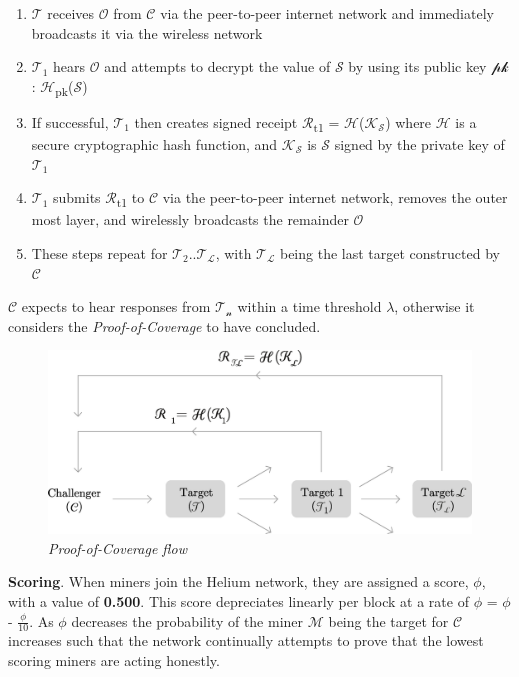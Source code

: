 \documentclass[letterpaper,11pt]{article}
\def\proofofcoverage/{\textit{Proof-of-Coverage}}
\begin{document}
\begin{enumerate}
  \item $\mathcal{T}$ receives $\mathcal{O}$ from $\mathcal{C}$ via the peer-to-peer internet network and immediately broadcasts it via the wireless network
  \item $\mathcal{T_1}$ hears $\mathcal{O}$ and attempts to decrypt the value of $\mathcal{S}$ by using its public key $\mathcal{pk}$: $\mathcal{H}$\textsubscript{pk}($\mathcal{S}$)
  \item If successful, $\mathcal{T_1}$ then creates signed receipt $\mathcal{R}$\textsubscript{t1} = $\mathcal{H}$($\mathcal{K_S}$) where $\mathcal{H}$ is a secure cryptographic hash function, and $\mathcal{K_S}$ is $\mathcal{S}$ signed by the private key of $\mathcal{T_1}$
  \item $\mathcal{T_1}$ submits $\mathcal{R}$\textsubscript{t1} to $\mathcal{C}$ via the peer-to-peer internet network, removes the outer most layer, and wirelessly broadcasts the remainder $\mathcal{O}$
  \item These steps repeat for $\mathcal{T_2}$..$\mathcal{T_L}$, with $\mathcal{T_L}$ being the last target constructed by $\mathcal{C}$
\end{enumerate}

$\mathcal{C}$ expects to hear responses from $\mathcal{T_n}$ within a time threshold $\mathcal{\lambda}$, otherwise it considers the \proofofcoverage/ to have concluded.\newline

\begin{figure}[H]
	\begin{center}
  		\includegraphics[width=\textwidth]{diagram4.eps}
  		\caption{\textit{\proofofcoverage/ flow}}
  		\label{fig:poc-flow}
 	\end{center}
\end{figure}

\textbf{Scoring}. \label{scores} When miners join the Helium network, they are assigned a score, $\mathcal{\phi}$, with a value of \textbf{0.500}. This score depreciates linearly per block at a rate of $\mathcal{\phi}$ = $\mathcal{\phi}$ - \(\frac{\phi}{10}\). As $\mathcal{\phi}$ decreases the probability of the miner $\mathcal{M}$ being the target for $\mathcal{C}$ increases such that the network continually attempts to prove that the lowest scoring miners are acting honestly.\newline 
\end{document}
